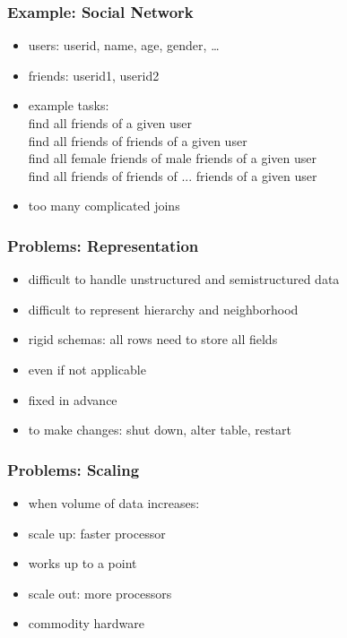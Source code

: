 \documentclass[dvipsnames]{beamer}
\theoremstyle{plain}
\begin{document}
\begin{frame}
  \frametitle{Example: Social Network}

  \begin{itemize}
    \item users: userid, name, age, gender, \ldots
    \item friends: userid1, userid2

    \medskip
    \item example tasks:\\
      find all friends of a given user\\
      find all friends of friends of a given user\\
      find all female friends of male friends of a given user\\
      find all friends of friends of ... friends of a given user\\

    \pause
    \medskip
    \item too many complicated joins
  \end{itemize}
\end{frame}

\begin{frame}
  \frametitle{Problems: Representation}

  \begin{itemize}
    \item difficult to handle unstructured and semistructured data
    \item difficult to represent hierarchy and neighborhood

    \pause
    \medskip
    \item rigid schemas: all rows need to store all fields
    \item even if not applicable
    \smallskip
    \item fixed in advance
    \item to make changes: shut down, alter table, restart
  \end{itemize}
\end{frame}

\begin{frame}
  \frametitle{Problems: Scaling}

  \begin{itemize}
    \item when volume of data increases:

    \medskip
    \item scale up: faster processor
    \item works up to a point

    \smallskip
    \item scale out: more processors
    \item commodity hardware
  \end{itemize}
\end{frame}
\end{document}
